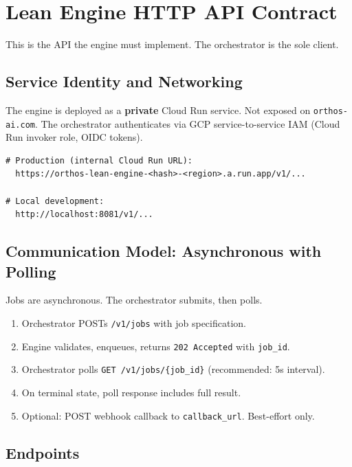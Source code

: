 \documentclass[11pt,a4paper]{article}
\begin{document}
\section{Lean Engine HTTP API Contract}
\label{sec:api_contract}

This is the API the engine must implement. The orchestrator is the sole client.

\subsection{Service Identity and Networking}

The engine is deployed as a \textbf{private} Cloud Run service. Not exposed on \texttt{orthos-ai.com}. The orchestrator authenticates via GCP service-to-service IAM (Cloud Run invoker role, OIDC tokens).

\begin{lstlisting}
# Production (internal Cloud Run URL):
  https://orthos-lean-engine-<hash>-<region>.a.run.app/v1/...

# Local development:
  http://localhost:8081/v1/...
\end{lstlisting}

\subsection{Communication Model: Asynchronous with Polling}

Jobs are asynchronous. The orchestrator submits, then polls.

\begin{enumerate}[leftmargin=2em]
  \item Orchestrator POSTs \texttt{/v1/jobs} with job specification.
  \item Engine validates, enqueues, returns \texttt{202 Accepted} with \texttt{job\_id}.
  \item Orchestrator polls \texttt{GET /v1/jobs/\{job\_id\}} (recommended: 5s interval).
  \item On terminal state, poll response includes full result.
  \item Optional: POST webhook callback to \texttt{callback\_url}. Best-effort only.
\end{enumerate}

\subsection{Endpoints}
\end{document}
